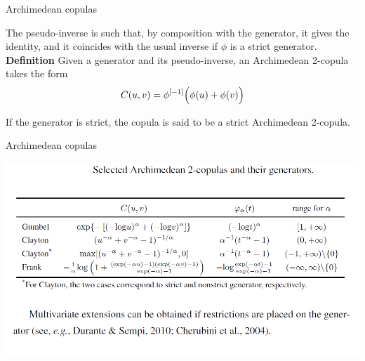 \documentclass[11pt]{beamer}
\theoremstyle{plain}
\theoremstyle{definition}
\theoremstyle{remark}
\begin{document}
%
\begin{frame}{Archimedean copulas}


The pseudo-inverse is such that, by composition with the generator, it gives the identity, and it coincides with the usual      
	inverse if $\phi$ is a strict generator. \\[2ex]

\noindent\textbf{Definition} Given a generator and its pseudo-inverse, an Archimedean 2-copula takes the form
\begin{equation}
C(u, v) = \phi^{[-1]}\Bigl( \phi(u) + \phi(v) \Bigr)
\end{equation}

If the generator is strict, the copula is said to be a strict Archimedean 2-copula.				  						  

\end{frame}
%
\begin{frame}{Archimedean copulas}
\begin{center}
\includegraphics[scale=.45]{fig/copule_archimedee_tabella.PNG} 
\end{center}
\end{frame}
%
\end{document}
